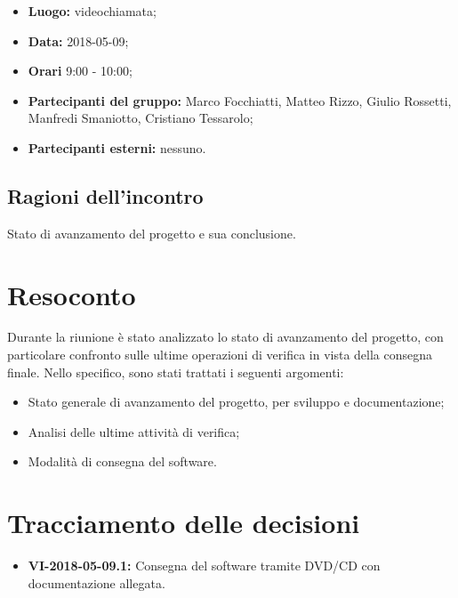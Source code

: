 \documentclass[openany,12pt,a4paper]{article}
\begin{document}
	\begin{itemize} 
	    \item \textbf{Luogo:} videochiamata;
	    \item \textbf{Data:} 2018-05-09;
	    \item \textbf{Orari} 9:00 - 10:00;
	    \item \textbf{Partecipanti del gruppo:} Marco Focchiatti, Matteo Rizzo, Giulio Rossetti, Manfredi Smaniotto, Cristiano Tessarolo;
	    \item \textbf{Partecipanti esterni:} nessuno.
	\end{itemize}
	
	\subsection{Ragioni dell'incontro}
	
	Stato di avanzamento del progetto e sua conclusione.

	\section{Resoconto}
	
	Durante la riunione è stato analizzato lo stato di avanzamento del progetto, con particolare confronto sulle ultime operazioni di verifica in vista della consegna finale. Nello specifico, sono stati trattati i seguenti argomenti:
	
	\begin{itemize}
		\item Stato generale di avanzamento del progetto, per sviluppo e documentazione;
		\item Analisi delle ultime attività di verifica;
		\item Modalità di consegna del software.
	\end{itemize}  
	
	\section{Tracciamento delle decisioni}
	
	\begin{itemize}
	    \item \textbf{VI-2018-05-09.1:} Consegna del software tramite DVD/CD con documentazione allegata.
	\end{itemize}	

	
\end{document}
